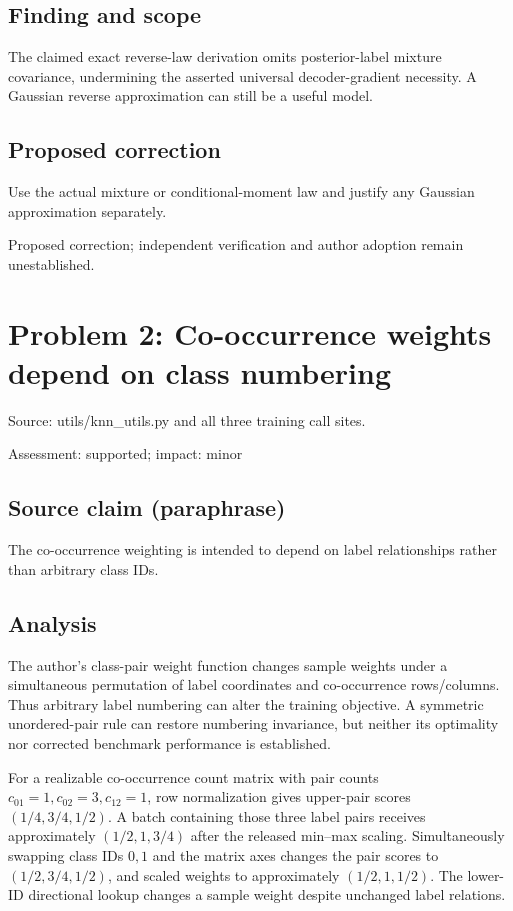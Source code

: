 \documentclass[11pt]{article}
\begin{document}
\subsection*{Finding and scope}

The claimed exact reverse-law derivation omits posterior-label mixture covariance, undermining the asserted universal decoder-gradient necessity. A Gaussian reverse approximation can still be a useful model.

\subsection*{Proposed correction}

Use the actual mixture or conditional-moment law and justify any Gaussian approximation separately.

Proposed correction; independent verification and author adoption remain unestablished.

\section*{Problem 2: Co-occurrence weights depend on class numbering}

Source: utils/knn\_utils.py and all three training call sites.

Assessment: supported; impact: minor

\subsection*{Source claim (paraphrase)}

The co-occurrence weighting is intended to depend on label relationships rather than arbitrary class IDs.

\subsection*{Analysis}

The author's class-pair weight function changes sample weights under a simultaneous permutation of label coordinates and co-occurrence rows/columns. Thus arbitrary label numbering can alter the training objective. A symmetric unordered-pair rule can restore numbering invariance, but neither its optimality nor corrected benchmark performance is established.

For a realizable co-occurrence count matrix with pair counts \(c_{01}=1,c_{02}=3,c_{12}=1\), row normalization gives upper-pair scores \((1/4,3/4,1/2)\). A batch containing those three label pairs receives approximately \((1/2,1,3/4)\) after the released min–max scaling. Simultaneously swapping class IDs \(0,1\) and the matrix axes changes the pair scores to \((1/2,3/4,1/2)\), and scaled weights to approximately \((1/2,1,1/2)\). The lower-ID directional lookup changes a sample weight despite unchanged label relations.
\end{document}
